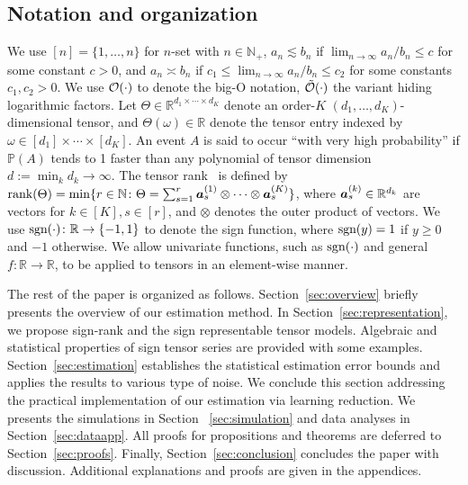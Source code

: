 \documentclass[twoside,11pt]{article}
\theoremstyle{plain}
\theoremstyle{definition}
\def\sign{\textup{sgn}}
\begin{document}
\subsection{Notation and organization}
 We use $[n]=\{1,\ldots,n\}$ for $n$-set with $n\in\mathbb{N}_{+}$, $a_n\lesssim b_n$ if $\lim_{n\to\infty} a_n/b_n\leq c$ for some constant $c>0$, and $a_n\asymp b_n$ if $c_1\leq \lim_{n\to \infty} a_n/b_n\leq c_2$ for some constants $c_1,c_2>0$. We use $\mathcal{O}(\cdot)$ to denote the big-O notation, $\tilde {\mathcal{O}}(\cdot)$ the variant hiding logarithmic factors. Let $\Theta\in\mathbb{R}^{d_1\times \cdots \times d_K}$ denote an order-$K$ $(d_1,\ldots,d_K)$-dimensional tensor, and $\Theta(\omega)\in\mathbb{R}$ denote the tensor entry indexed by $\omega \in[d_1]\times \cdots \times [d_K]$. An event $A$ is said to occur ``with very high probability'' if $\mathbb{P}(A)$ tends to 1 faster than any polynomial of tensor dimension $d:=\min_k d_k \to\infty$. The tensor rank~\citep{hitchcock1927expression} is defined by $\text{rank}(\Theta)=\min\{r\in\mathbb{N}\colon \Theta=\sum_{s=1}^r\bm{a}^{(1)}_s\otimes\cdots\otimes \bm{a}^{(K)}_s\}$, where $\bm{a}^{(k)}_s\in\mathbb{R}^{d_k}$ are vectors for $k\in[K], s\in[r]$, and $\otimes$ denotes the outer product of vectors. We use $\sign(\cdot)\colon \mathbb{R}\to\{-1,1\}$ to denote the sign function, where $\sign(y)=1$ if $y\geq 0$ and $-1$ otherwise. We allow univariate functions, such as $\sign(\cdot)$ and general $f\colon \mathbb{R}\to\mathbb{R}$, to be applied to tensors in an element-wise manner. 
 
The rest of the paper is organized as follows. Section~\ref{sec:overview} briefly presents the overview of our  estimation method. In Section~\ref{sec:representation}, we propose sign-rank and the sign representable tensor models. Algebraic and statistical properties of sign tensor series are provided with some examples. Section~\ref{sec:estimation} establishes the statistical estimation error bounds and applies the results to various type of noise. We conclude this section addressing the practical implementation of our estimation via learning reduction.  We presents the simulations in Section ~\ref{sec:simulation} and data analyses in Section~\ref{sec:dataapp}.  All proofs for propositions and theorems are deferred to Section~\ref{sec:proofs}. Finally, Section~\ref{sec:conclusion} concludes the paper with discussion. Additional explanations and proofs are given in the appendices.
\end{document}
